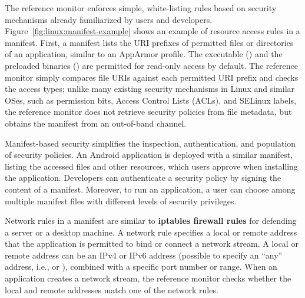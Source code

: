 The reference monitor enforces simple, white-listing rules
based on security mechanisms
already familiarized by users and developers.
Figure~\ref{fig:linux:manifest-example} shows an example of resource access rules
in a manifest.
First, a manifest lists
the URI prefixes of permitted files or directories
of an application,
similar to an AppArmor profile.
The executable () and the preloaded \libos{} binaries ()
are permitted for read-only access by default.
The reference monitor
simply compares file URIs against each permitted URI prefix
and checks the access types;
unlike many existing security mechanisms in Linux and similar OSes, such as permission bits, Access Control Lists (ACLs), and SELinux labels,
the reference monitor does not retrieve
security policies from file metadata, but obtains the manifest from an out-of-band channel.


Manifest-based security
simplifies the inspection, authentication, and population
of security policies.
An Android application is deployed with a similar manifest,
listing the accessed files and other resources,
which users approve when installing the application.
Developers can authenticate a security policy by signing the content of a manifest.
Moreover, to run an application, a user can choose among multiple manifest files
with different levels of security privileges.



Network rules in a manifest are similar to {\bf iptables firewall rules} for defending a server or a desktop machine.
A network rule specifies a local or remote address
that the application is permitted to bind or connect a network stream.
A local or remote address
can be an IPv4 or IPv6 address (possible to specify an ``any'' address, i.e.,  or \code{[::1]}), combined with a specific port number or range.
When an application creates a network stream,
the reference monitor checks whether the local and remote addresses
match one of the network rules.








